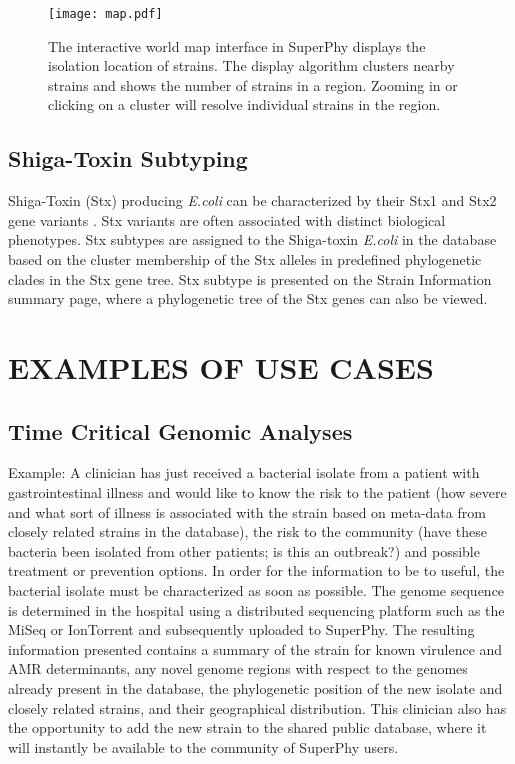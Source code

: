 \documentclass[a4paper,twoside]{article}
\begin{document}
\begin{figure}[t]
  \centering
   {\texttt{[image: map.pdf]}}
   \vspace{0.2cm}
  \caption{The interactive world map interface in SuperPhy displays the isolation location of strains. The display algorithm clusters nearby strains and shows the number of strains in a region. Zooming in or clicking on a cluster will resolve individual strains in the region.}
  \label{fig:map}
\end{figure}


\subsection{Shiga-Toxin Subtyping}

Shiga-Toxin (Stx) producing \textit{E.coli} can be characterized by their Stx1 and Stx2 gene variants \cite{scheutz_multicenter_2012}. Stx variants are often associated with distinct biological phenotypes. Stx subtypes are assigned to the Shiga-toxin \textit{E.coli} in the database based on the cluster membership of the Stx alleles in predefined phylogenetic clades in the Stx gene tree. Stx subtype is presented on the Strain Information summary page, where a phylogenetic tree of the Stx genes can also be viewed.

\section{\uppercase{Examples of Use Cases}}
\label{sec:cases}
\subsection{Time Critical Genomic Analyses}
Example: A clinician has just received a bacterial isolate from a patient with gastrointestinal illness and would like to know the risk to the patient (how severe and what sort of illness is associated with the strain based on meta-data from closely related strains in the database), the risk to the community (have these bacteria been isolated from other patients; is this an outbreak?) and possible treatment or prevention options. In order for the information to be to useful, the bacterial isolate must be characterized as soon as possible. The genome sequence is determined in the hospital using a distributed sequencing platform such as the MiSeq or IonTorrent and subsequently uploaded to SuperPhy. The resulting information presented contains a summary of the strain for known virulence and AMR determinants, any novel genome regions with respect to the genomes already present in the database, the phylogenetic position of the new isolate and closely related strains, and their geographical distribution. This clinician also has the opportunity to add the new strain to the shared public database, where it will instantly be available to the community of SuperPhy users.
\end{document}
